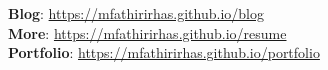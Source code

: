 \begin{cvparagraph}


    \textbf{Blog}: \href{https://mfathirirhas.github.io/blog}{https://mfathirirhas.github.io/blog} 
    \\
    \textbf{More}: \href{https://mfathirirhas.github.io/resume}{https://mfathirirhas.github.io/resume}
    \\
    \textbf{Portfolio}: \href{https://mfathirirhas.github.io/portfolio}{https://mfathirirhas.github.io/portfolio}
    \\
\end{cvparagraph}